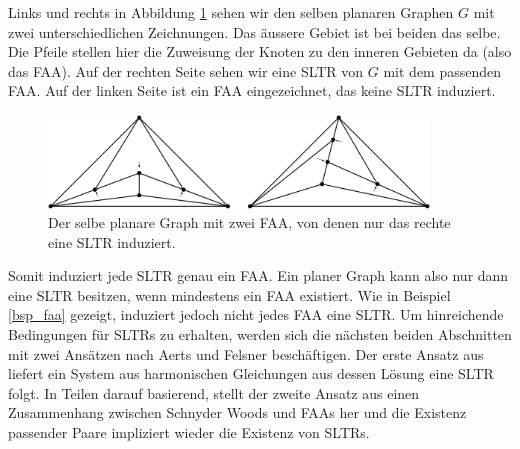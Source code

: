 \begin{example}
Links und rechts in Abbildung \ref{exp_faa} sehen wir den selben planaren Graphen $G$ mit zwei unterschiedlichen Zeichnungen. Das äussere Gebiet ist bei beiden das selbe. Die Pfeile stellen hier die Zuweisung der Knoten zu den inneren Gebieten da (also das FAA). Auf der rechten Seite sehen wir eine SLTR von $G$ mit dem passenden FAA. Auf der linken Seite ist ein FAA eingezeichnet, das keine SLTR induziert.

\begin{figure}[h]
	\centering
  \includegraphics[width=0.9\textwidth]{faa_def.png}
  \caption{Der selbe planare Graph mit zwei FAA, von denen nur das rechte eine SLTR induziert.}
  \label{exp_faa}
\end{figure}
\end{example}

Somit induziert jede SLTR genau ein FAA. Ein planer Graph kann also nur dann eine SLTR besitzen, wenn mindestens ein FAA existiert. Wie in Beispiel \ref{bsp_faa} gezeigt, induziert jedoch nicht jedes FAA eine SLTR. Um hinreichende Bedingungen für SLTRs zu erhalten, werden sich die nächsten beiden Abschnitten mit zwei Ansätzen nach Aerts und Felsner beschäftigen. Der erste Ansatz aus \cite{af13} liefert ein System aus harmonischen Gleichungen aus dessen Lösung eine SLTR folgt. In Teilen darauf basierend, stellt der zweite Ansatz aus \cite{af15} einen Zusammenhang zwischen Schnyder Woods und FAAs her und die Existenz passender Paare impliziert wieder die Existenz von SLTRs.



